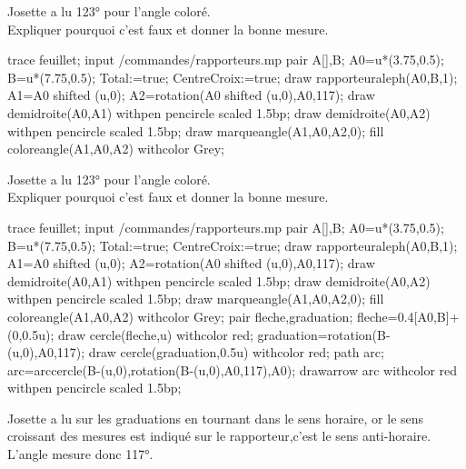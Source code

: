 \begin{exercice*}
   Josette a lu \ang{123} pour l'angle coloré.\\
   Expliquer pourquoi c'est faux et donner la bonne mesure.\\
   \begin{Geometrie}[CoinBG={(0,-3.5u)},CoinHD={(7.5u,4u)}]
      trace feuillet;
      input \persopath/commandes/rapporteurs.mp
      pair A[],B;
      A0=u*(3.75,0.5);
      B=u*(7.75,0.5);
      Total:=true;%
      CentreCroix:=true;%
      draw rapporteuraleph(A0,B,1);        
      A1=A0 shifted (u,0); 
      A2=rotation(A0 shifted (u,0),A0,117);
      draw demidroite(A0,A1) withpen pencircle scaled 1.5bp;
      draw demidroite(A0,A2) withpen pencircle scaled 1.5bp;
      draw marqueangle(A1,A0,A2,0);
      fill coloreangle(A1,A0,A2) withcolor Grey;
   \end{Geometrie}
   \par\vspace*{4mm}\dotfill
   \par\vspace*{4mm}\dotfill
   \par\vspace*{4mm}\dotfill
   \par\vspace*{4mm}\dotfill
   \par\vspace*{4mm}\dotfill
\end{exercice*}
\begin{corrige}
   Josette a lu \ang{123} pour l'angle coloré.\\
   Expliquer pourquoi c'est faux et donner la bonne mesure.\\
   \begin{Geometrie}[CoinBG={(0,-3.5u)},CoinHD={(7.5u,4u)}]
      trace feuillet;
      input \persopath/commandes/rapporteurs.mp
      pair A[],B;
      A0=u*(3.75,0.5);
      B=u*(7.75,0.5);
      Total:=true;%
      CentreCroix:=true;%
      draw rapporteuraleph(A0,B,1);        
      A1=A0 shifted (u,0); 
      A2=rotation(A0 shifted (u,0),A0,117);
      draw demidroite(A0,A1) withpen pencircle scaled 1.5bp;
      draw demidroite(A0,A2) withpen pencircle scaled 1.5bp;
      draw marqueangle(A1,A0,A2,0);
      fill coloreangle(A1,A0,A2) withcolor Grey;
      pair fleche,graduation;
      fleche=0.4[A0,B]+(0,0.5u);
      draw cercle(fleche,u) withcolor red;
      graduation=rotation(B-(u,0),A0,117);
      draw cercle(graduation,0.5u) withcolor red;
      path arc;
      arc=arccercle(B-(u,0),rotation(B-(u,0),A0,117),A0);
      drawarrow arc withcolor red withpen pencircle scaled 1.5bp;
   \end{Geometrie}

   {\red Josette a lu sur les graduations en tournant dans le sens horaire, or le sens croissant des mesures est indiqué sur le rapporteur,c'est le sens anti-horaire.
   L'angle mesure donc \ang{117}.}
\end{corrige}
   